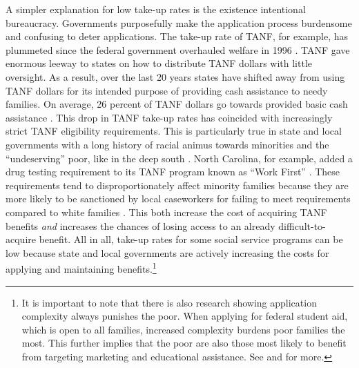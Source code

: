 \documentclass[12pt,letterpaperpaper,]{book}
\begin{document}
A simpler explanation for low take-up rates is the existence intentional
bureaucracy. Governments purposefully make the application process
burdensome and confusing to deter applications. The take-up rate of
TANF, for example, has plummeted since the federal government overhauled
welfare in 1996 \citep{ribar_how_2014}. TANF gave enormous leeway to
states on how to distribute TANF dollars with little oversight. As a
result, over the last 20 years states have shifted away from using TANF
dollars for its intended purpose of providing cash assistance to needy
families. On average, 26 percent of TANF dollars go towards provided
basic cash assistance \citep{schott_how_2015}. This drop in TANF take-up
rates has coincided with increasingly strict TANF eligibility
requirements. This is particularly true in state and local governments
with a long history of racial animus towards minorities and the
``undeserving'' poor, like in the deep south \citep{keiser_race_2004}.
North Carolina, for example, added a drug testing requirement to its
TANF program known as ``Work First'' \citep{lynn_bonner_nc_2016}. These
requirements tend to disproportionately affect minority families because
they are more likely to be sanctioned by local caseworkers for failing
to meet requirements compared to white families
\citep{monnat_color_2010}. This both increase the cost of acquiring TANF
benefits \emph{and} increases the chances of losing access to an already
difficult-to-acquire benefit. All in all, take-up rates for some social
service programs can be low because state and local governments are
actively increasing the costs for applying and maintaining
benefits.\footnote{It is important to note that there is also research
  showing application complexity always punishes the poor. When applying
  for federal student aid, which is open to all families, increased
  complexity burdens poor families the most. This further implies that
  the poor are also those most likely to benefit from targeting
  marketing and educational assistance. See \citet{dynarski_cost_2006}
  and \citet{bertrand_behavioral_2006} for more.}
\end{document}
